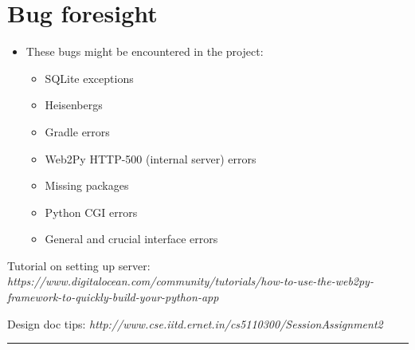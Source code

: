 \documentclass[12pt]{article}
\begin{document}
\section{Bug foresight}
\begin{itemize}
\item These bugs might be encountered in the project:
\begin{itemize}
	\color {blue}
	\item SQLite exceptions
	\item Heisenbergs
	\item Gradle errors
	\item Web2Py HTTP-500 (internal server) errors
	\item Missing packages
	\item Python CGI errors
	\item General and crucial interface errors
\end{itemize}
\end{itemize}


 \begin{thebibliography}{99}

 Tutorial on setting up server: {\em
https://www.digitalocean.com/community/tutorials/how-to-use-the-web2py-framework-to-quickly-build-your-python-app}

 Design doc tips: {\em
http://www.cse.iitd.ernet.in/cs5110300/SessionAssignment2}

\end{thebibliography}

%
%

{\color{red} \rule{\linewidth}{0.5mm} }
\end{document}
